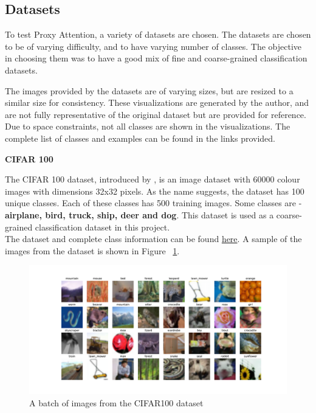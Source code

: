 \documentclass[a4paper,11pt,openright]{book}
\begin{document}
\subsection{Datasets}
To test Proxy Attention, a variety of datasets are chosen. The datasets are chosen to be of varying difficulty, and to have varying number of classes. The objective in choosing them was to have a good mix of fine and coarse-grained classification datasets. 

The images provided by the datasets are of varying sizes, but are resized to a similar size for consistency. These visualizations are generated by the author, and are not fully representative of the original dataset but are provided for reference. Due to space constraints, not all classes are shown in the visualizations. The complete list of classes and examples can be found in the links provided.

\textbf{CIFAR 100}

The CIFAR 100 dataset, introduced by \cite{krizhevskyLearningMultipleLayers}, is an image dataset with 60000 colour images with dimensions 32x32 pixels. As the name suggests, the dataset has 100 unique classes. Each of these classes has 500 training images. Some classes are - \textbf{airplane, bird, truck, ship, deer and dog}. This dataset is used as a coarse-grained classification dataset in this project.\\
The dataset and complete class information can be found \href{https://www.kaggle.com/datasets/fedesoriano/cifar100}{here}.
A sample of the images from the dataset is shown in Figure ~\ref{fig:cifar100}.

\begin{figure}[!htb]
    \centering
    \includegraphics[width=1\textwidth]{images/cifar100.pdf}
    \caption{A batch of images from the CIFAR100 dataset}
    \label{fig:cifar100}
\end{figure}
\end{document}
